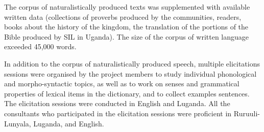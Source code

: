 The corpus of naturalistically produced texts was supplemented with available written data (collections of proverbs produced by the communities, readers, books about the history of the kingdom, the translation of the portions of the Bible produced by SIL in Uganda). 
The size of the corpus of written language exceeded 45,000 words.

In addition to the corpus of naturalistically produced speech, multiple elicitations sessions were organised by the project members to study individual phonological and morpho-syntactic topics, as well as to work on senses and grammatical properties of lexical items in the dictionary, and to collect examples sentences. 
The elicitation sessions were conducted in English and Luganda. 
All the consultants who participated in the elicitation sessions were proficient in Ru\-ruu\-li\hyp{}Lu\-nya\-la, Luganda, and English.
